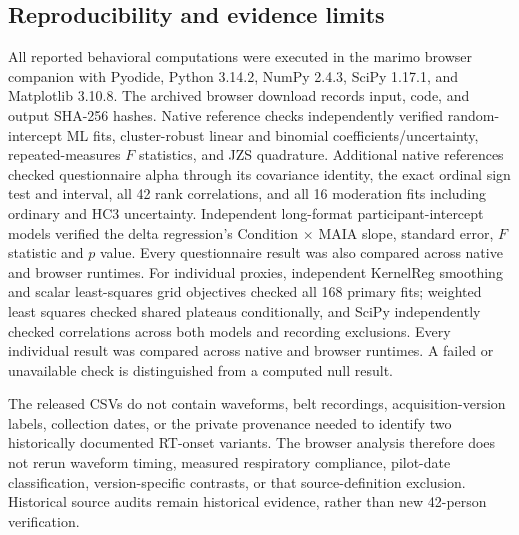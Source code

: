 \subsection{Reproducibility and evidence limits}

All reported behavioral computations were executed in the marimo browser companion with Pyodide, Python 3.14.2, NumPy 2.4.3, SciPy 1.17.1, and Matplotlib 3.10.8. The archived browser download records input, code, and output SHA-256 hashes. Native reference checks independently verified random-intercept ML fits, cluster-robust linear and binomial coefficients/uncertainty, repeated-measures $F$ statistics, and JZS quadrature. Additional native references checked questionnaire alpha through its covariance identity, the exact ordinal sign test and interval, all 42 rank correlations, and all 16 moderation fits including ordinary and HC3 uncertainty. Independent long-format participant-intercept models verified the delta regression's Condition $\times$ MAIA slope, standard error, $F$ statistic and $p$ value. Every questionnaire result was also compared across native and browser runtimes. For individual proxies, independent KernelReg smoothing and scalar least-squares grid objectives checked all 168 primary fits; weighted least squares checked shared plateaus conditionally, and SciPy independently checked correlations across both models and recording exclusions. Every individual result was compared across native and browser runtimes. A failed or unavailable check is distinguished from a computed null result.

The released CSVs do not contain waveforms, belt recordings, acquisition-version labels, collection dates, or the private provenance needed to identify two historically documented RT-onset variants. The browser analysis therefore does not rerun waveform timing, measured respiratory compliance, pilot-date classification, version-specific contrasts, or that source-definition exclusion. Historical source audits remain historical evidence, rather than new 42-person verification.
